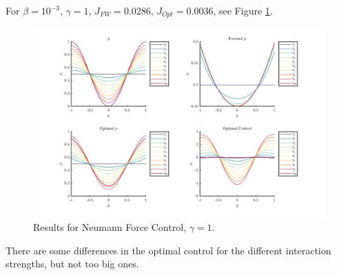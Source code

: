 \documentclass[11pt, a4paper]{article}
\theoremstyle{definition}
\begin{document}
For $\beta = 10^{-3}$, $\gamma = 1$, $J_{FW} = 0.0286$, $J_{Opt} = 0.0036$, see Figure \ref{ResFN1b}.
\begin{figure}[h]
	\includegraphics[scale=0.3]{ResFN1b.jpg}
	\caption{Results for Neumann Force Control, $\gamma = 1$.}
	\label{ResFN1b}
\end{figure}
There are some differences in the optimal control for the different interaction strengths, but not too big ones.
\end{document}
